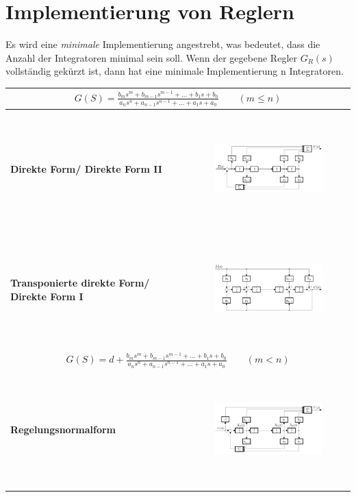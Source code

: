 \section{Implementierung von Reglern }
Es wird eine \textit{minimale} Implementierung angestrebt, was bedeutet, dass die Anzahl
der Integratoren minimal sein soll. Wenn der gegebene Regler $G_R(s)$ vollständig
gekürzt ist, dann hat eine minimale Implementierung n Integratoren.

\begin{center}
	\begin{longtable}{|p{}|c|}
	\hline
	\multicolumn{2}{|c|}{$G(S) = \frac{b_ms^m + b_{m-1}s^{m-1}+\dots + b_1s+b_0}{a_ns^n + a_{n-1}s^{n-1}+\dots + a_1s+a_0} \qquad (m\le n)$}\\
	\hline
	\textbf{Direkte Form/ Direkte Form II}
		& \includegraphics[width = 0.7\textwidth, height = 4.4cm]{./images/DirekteForm2}\\
	\hline
	\textbf{Transponierte direkte Form/ Direkte Form I}
		& \includegraphics[width = 0.7\textwidth, height = 4.4cm]{./images/DirekteForm1}\\
	\hline
	\multicolumn{2}{|c|}{$G(S) = d + \frac{b_ms^m + b_{m-1}s^{m-1}+\dots + b_1s+b_0}{a_ns^n + a_{n-1}s^{n-1}+\dots + a_1s+a_0} \qquad (m < n)$}\\
	\hline
	\textbf{Regelungsnormalform}
		& \includegraphics[width = 0.7\textwidth, height = 4.4cm]{./images/regelungsnormalform}\\
	\hline
	\end{longtable}
\end{center}
